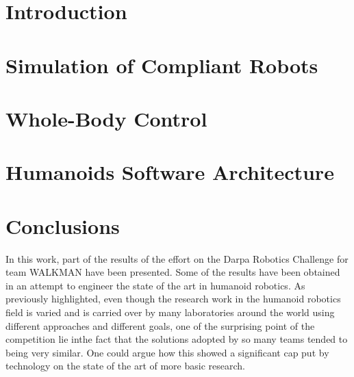 \documentclass[%
	paper=A4,					%
	twoside=true,				%
	openright,			.
	parskip=full,				%
	chapterprefix=true,			%
	11pt,						%
	headings=normal,			%
	bibliography=totoc,			%
	listof=totoc,				%
	titlepage=on,				%
	captions=tableabove,		%
	draft=true,				%
]{scrreprt}%
\begin{document}

\pagestyle{empty}				%
\cleardoublepage

\pagestyle{plain}				%
\cleardoublepage
%
\cleardoublepage
%
\setcounter{tocdepth}{2}		%
\tableofcontents				%
\cleardoublepage

\setcounter{page}{1}			%
\pagestyle{maincontentstyle} 	%

\chapter{Introduction}


\chapter{Simulation of Compliant Robots}


\chapter{Whole-Body Control}


\chapter{Humanoids Software Architecture}
\label{architecture}


\chapter{Conclusions}

In this work, part of the results of the effort on the Darpa Robotics Challenge for team WALKMAN have been presented.
Some of the results have been obtained in an attempt to engineer the state of the art in humanoid robotics.
As previously highlighted, even though the research work in the humanoid robotics field is varied and is carried over by many laboratories around the world using different approaches and different goals, one of the surprising point of the competition lie inthe fact that the solutions adopted by so many teams tended to being very similar. One could argue how this showed a significant cap put by technology on the state of the art of more basic research.
\end{document}
